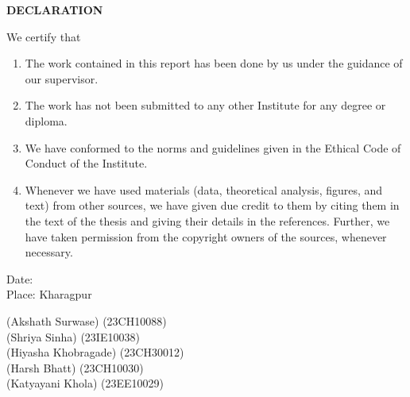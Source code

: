 \documentclass[11pt,a4paper]{report}
\begin{document}
{}
\begin{center}{\Large\bfseries DECLARATION}\end{center}
\vspace{0.3in}
\noindent We certify that
\begin{enumerate}[label=(\alph*), itemsep=6pt]
  \item The work contained in this report has been done by us under the guidance of our supervisor.
  \item The work has not been submitted to any other Institute for any degree or diploma.
  \item We have conformed to the norms and guidelines given in the Ethical Code of Conduct of the Institute.
  \item Whenever we have used materials (data, theoretical analysis, figures, and text) from other sources, we have given due credit to them by citing them in the text of the thesis and giving their details in the references. Further, we have taken permission from the copyright owners of the sources, whenever necessary.
\end{enumerate}
\vfill
\singlespacing
\noindent\begin{minipage}[b]{0.45\textwidth}
Date: \underline{\hspace{3cm}}\\
Place: Kharagpur
\end{minipage}\hfill
\begin{minipage}[b]{0.5\textwidth}
\raggedleft
(Akshath Surwase) (23CH10088)\\
(Shriya Sinha) (23IE10038)\\
(Hiyasha Khobragade) (23CH30012)\\
(Harsh Bhatt) (23CH10030)\\
(Katyayani Khola) (23EE10029)
\end{minipage}
\end{document}
